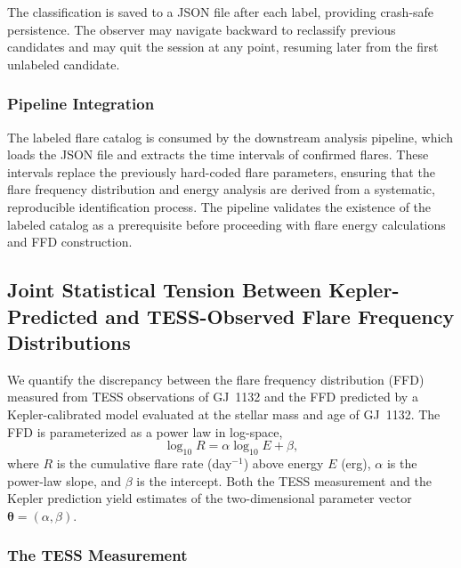 The classification is saved to a JSON file after each label, providing
crash-safe persistence.  The observer may navigate backward to
reclassify previous candidates and may quit the session at any point,
resuming later from the first unlabeled candidate.

\subsubsection{Pipeline Integration}

The labeled flare catalog is consumed by the downstream analysis
pipeline, which loads the JSON file and extracts the time intervals
of confirmed flares.  These intervals replace the previously
hard-coded flare parameters, ensuring that the flare frequency
distribution and energy analysis are derived from a systematic,
reproducible identification process.  The pipeline validates the
existence of the labeled catalog as a prerequisite before proceeding
with flare energy calculations and FFD construction.

\subsection{Joint Statistical Tension Between Kepler-Predicted and
TESS-Observed Flare Frequency Distributions}
\label{sec:joint_tension}

We quantify the discrepancy between the flare frequency distribution
(FFD) measured from TESS observations of GJ~1132 and the FFD
predicted by a Kepler-calibrated model evaluated at the stellar mass
and age of GJ~1132.  The FFD is parameterized as a power law in
log-space,
\begin{equation}
\log_{10} R = \alpha \log_{10} E + \beta,
\label{eq:ffd_powerlaw}
\end{equation}
where $R$ is the cumulative flare rate (day$^{-1}$) above energy $E$
(erg), $\alpha$ is the power-law slope, and $\beta$ is the intercept.
Both the TESS measurement and the Kepler prediction yield estimates of
the two-dimensional parameter vector $\boldsymbol{\theta} = (\alpha,
\beta)$.

\subsubsection{The TESS Measurement}

